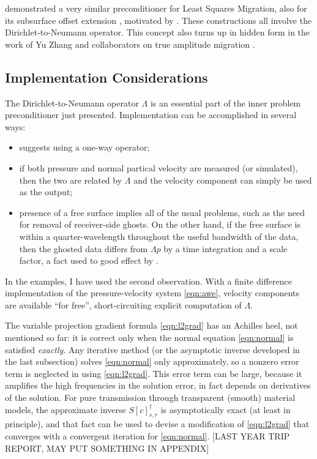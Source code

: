 \cite{HouSymes:EAGE16} demonstrated a very similar preconditioner for Least Squares Migration, also for its subsurface offset extension \cite[]{HouSymes:16}, motivated by \cite{tenKroode:12}. These constructions all involve the Dirichlet-to-Neumann operator. This concept also turns up in hidden form in the work of Yu Zhang and collaborators on true amplitude migration \cite[]{YuZhang:14,TangXuZhang:13,XuWang:2012,XuZhangTang:11,Zhang:SEG09,ZhangYuSun:08,ZhangSunGray:07,ZhangBleistein:05,Bleisteinetal:05}.
 
\subsection{Implementation Considerations}
The Dirichlet-to-Neumann operator $\Lambda$ is an essential part of the inner problem preconditioner just presented. Implementation can be accomplished in several ways:
\begin{itemize}
\item \cite{tenKroode:12} suggests using a one-way operator;
\item if both pressure and normal partical velocity are measured (or simulated), then the two are related by $\Lambda$ and the velocity component can simply be used as the output;
\item presence of a free surface implies all of the usual problems, such as the need for removal of receiver-side ghosts. On the other hand, if the free surface is within a quarter-wavelength throughout the useful bandwidth of the data, then the ghosted data differs from $\Lambda p$ by a time integration and a scale factor, a fact used to good effect by \cite{HouSymes:15}.
\end{itemize}

In the examples, I have used the second observation. With a finite difference implementation of the pressure-velocity system \ref{eqn:awe}, velocity components are available ``for free'', short-circuiting explicit computation of $\Lambda$.

The variable projection gradient formula \ref{eqn:l2grad} has an Achilles heel, not mentioned so far: it is correct only when the normal equation \ref{eqn:normal} is satisfied {\em exactly}. Any iterative method (or the asymptotic inverse developed in the last subsection) solves \ref{eqn:normal} only approximately, so a nonzero error term is neglected in using \ref{eqn:l2grad}. This error term can be large, because it amplifies the high frequencies in the solution error, in fact depends on derivatives of the solution. For pure transmission through transparent (smooth) material models, the approximate inverse $S[c]_{s,r}^{\dagger}$ is asymptotically exact (at least in principle), and that fact can be used to devise a modification of \ref{eqn:l2grad} that converges with a convergent iteration for \ref{eqn:normal}. [LAST YEAR TRIP REPORT, MAY PUT SOMETHING IN APPENDIX]

